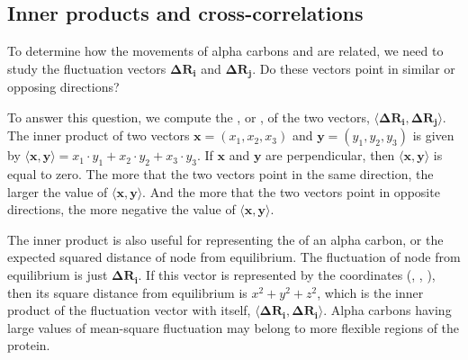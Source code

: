 \subsection{Inner products and cross-correlations}

To determine how the movements of alpha carbons  and  are related, we need to study the fluctuation vectors $ \mathbf{\Delta R_i} $ and $\mathbf{\Delta R_j}$. Do these vectors point in similar or opposing directions?

To answer this question, we compute the , or , of the two vectors, $ \langle \mathbf{\Delta R_i}, \mathbf{\Delta R_j} \rangle $. The inner product of two vectors $\mathbf{x} = (x_1, x_2, x_3)$ and $\mathbf{y} = (y_1, y_2, y_3)$ is given by $ \langle \mathbf{x}, \mathbf{y} \rangle = x_1 \cdot y_1 + x_2 \cdot y_2 + x_3 \cdot y_3$. If $\mathbf{x}$ and $\mathbf{y}$ are perpendicular, then $ \langle \mathbf{x}, \mathbf{y} \rangle $ is equal to zero. The more that the two vectors point in the same direction, the larger the value of $\langle \mathbf{x}, \mathbf{y} \rangle $. And the more that the two vectors point in opposite directions, the more negative the value of $\langle \mathbf{x}, \mathbf{y} \rangle $.\\

\begin{qbox}[%
	Say that $\mathbf{x} = (1, -2, 3)$, $\mathbf{y} = (2, -3, 5)$, and  $\mathbf{z} = (-1, 3, -4)$. Compute the inner products $\langle \mathbf{x}, \mathbf{y} \rangle$ and $\langle \mathbf{x}, \mathbf{z} \rangle$. Ensure that your answers match the preceding observation about the value of the inner product and the directions of vectors.
	]\end{qbox}

The inner product is also useful for representing  the  of an alpha carbon, or the expected squared distance of node  from equilibrium. The fluctuation of node  from equilibrium is just $\mathbf{\Delta R_i}$. If this vector is represented by the coordinates (, , ), then its square distance from equilibrium is $x^2 + y^2 + z^2$, which is the inner product of the fluctuation vector with itself, $ \langle \mathbf{\Delta R_i}, \mathbf{\Delta R_i} \rangle $. Alpha carbons having large values of mean-square fluctuation may belong to more flexible regions of the protein.\\

